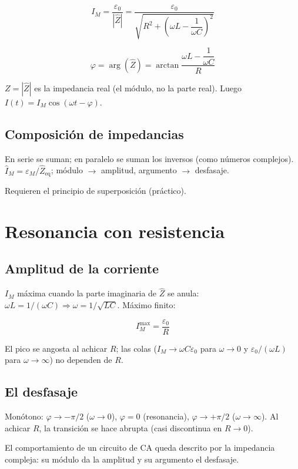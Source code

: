 \documentclass[12pt,a4paper]{article}
\begin{document}
\begin{keybox}
  \[
  \boxed{I_M = \frac{\varepsilon_0}{|\hat Z|}
        = \frac{\varepsilon_0}{\sqrt{R^2 + \left(\omega L -
          \dfrac{1}{\omega C}\right)^2}}}
  \]
\end{keybox}

\begin{keybox}[Desfasaje]
  \[
  \boxed{\varphi = \arg(\hat Z) = \arctan\frac{\omega L - \dfrac{1}{\omega C}}{R}}
  \]
\end{keybox}

$Z = |\hat Z|$ es la impedancia real (el módulo, no la parte real). Luego
$I(t) = I_M\cos(\omega t - \varphi)$.

\subsection{Composición de impedancias}

En serie se suman; en paralelo se suman los inversos (como números complejos).
$\hat I_M = \varepsilon_M/\hat Z_{\text{eq}}$; módulo $\to$ amplitud, argumento
$\to$ desfasaje.

\begin{notebox}
  Requieren el principio de superposición (práctico).
\end{notebox}

\section{Resonancia con resistencia}

\subsection{Amplitud de la corriente}

$I_M$ máxima cuando la parte imaginaria de $\hat Z$ se anula: $\omega L =
1/(\omega C) \Rightarrow \omega = 1/\sqrt{LC}$. Máximo finito:

\begin{keybox}
  \[
  \boxed{I_M^{\max} = \frac{\varepsilon_0}{R}}
  \]
\end{keybox}

El pico se angosta al achicar $R$; las colas ($I_M \to \omega C\varepsilon_0$
para $\omega\to 0$ y $\varepsilon_0/(\omega L)$ para $\omega\to\infty$) no
dependen de $R$.

\subsection{El desfasaje}

Monótono: $\varphi \to -\pi/2$ ($\omega\to 0$), $\varphi = 0$ (resonancia),
$\varphi \to +\pi/2$ ($\omega\to\infty$). Al achicar $R$, la transición se hace
abrupta (casi discontinua en $R\to 0$).

\begin{notebox}[Cierre]
  El comportamiento de un circuito de CA queda descrito por la impedancia
  compleja: su módulo da la amplitud y su argumento el desfasaje.
\end{notebox}
\end{document}
